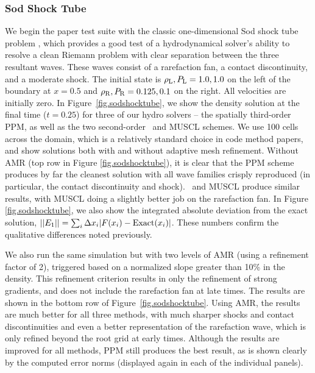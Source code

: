 \subsubsection{Sod Shock Tube}
\label{sec.tests.sodshock}

We begin the paper test suite with the classic one-dimensional Sod shock tube problem
\citep{Sod78}, which provides a good test of a hydrodynamical solver's
ability to resolve a clean Riemann problem with clear separation
between the three resultant waves.  These waves consist of a rarefaction fan, a
contact discontinuity, and a moderate shock.  The initial state is 
$\rho_{\rm L}, P_{\rm L} = 1.0, 1.0$ on the left of the boundary at 
$x=0.5$ and $\rho_{\rm R}, P_{\rm R} = 0.125, 0.1$ on the right.
All velocities are initially zero.  In
Figure~\ref{fig.sodshocktube}, we show the density solution at the
final time ($t=0.25$) for three of our hydro solvers -- the spatially third-order
PPM, as well as the two second-order \zeus\ and MUSCL schemes.  We use
100 cells across the domain, which is a relatively standard choice in
code method papers, and show solutions both with and without adaptive
mesh refinement.  Without AMR (top row in Figure \ref{fig.sodshocktube}), it is
clear that the PPM scheme produces by far the cleanest solution with
all wave families crisply reproduced (in particular, the contact
discontinuity and shock).  \zeus\ and MUSCL produce similar results,
with MUSCL doing a slightly better job on the rarefaction fan.  In Figure
\ref{fig.sodshocktube}, we also show the integrated absolute deviation from 
the exact solution, $||E_1|| = \sum_i \Delta x_i |F(x_i)-{\rm Exact}(x_i)|$.
These numbers confirm the qualitative differences noted
previously.

We also run the same simulation but with two levels of AMR (using a
refinement factor of 2), triggered based on a normalized slope greater
than 10\% in the density.  This refinement criterion results in only
the refinement of strong gradients, and
does not include the rarefaction fan at late times.  The results are
shown in the bottom row of Figure~\ref{fig.sodshocktube}.  Using AMR,
the results are much better for all three methods, with much sharper
shocks and contact discontinuities and even a better representation of
the rarefaction wave, which is only refined beyond the root grid at
early times.  Although the results are improved for all methods, PPM
still produces the best result, as is shown clearly by the computed
error norms (displayed again in each of the individual panels).

